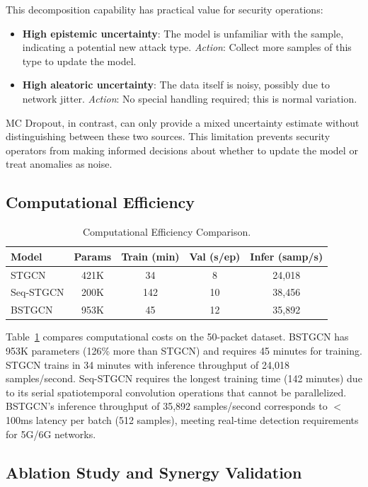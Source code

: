 \documentclass[lettersize,journal]{IEEEtran}
\begin{document}
This decomposition capability has practical value for security operations:
\begin{itemize}
\item \textbf{High epistemic uncertainty}: The model is unfamiliar with the sample, indicating a potential new attack type. \textit{Action}: Collect more samples of this type to update the model.
\item \textbf{High aleatoric uncertainty}: The data itself is noisy, possibly due to network jitter. \textit{Action}: No special handling required; this is normal variation.
\end{itemize}

MC Dropout, in contrast, can only provide a mixed uncertainty estimate without distinguishing between these two sources. This limitation prevents security operators from making informed decisions about whether to update the model or treat anomalies as noise.

\subsection{Computational Efficiency}

\begin{table}[!t]
\caption{Computational Efficiency Comparison.}
\label{tab:efficiency}
\centering
\begin{tabular}{lcccc}
\toprule
Model & Params & Train (min) & Val (s/ep) & Infer (samp/s) \\
\midrule
STGCN      & 421K & 34  & 8  & 24,018 \\
Seq-STGCN  & 200K & 142 & 10 & 38,456 \\
BSTGCN     & 953K & 45  & 12 & 35,892 \\
\bottomrule
\end{tabular}
\end{table}


Table~\ref{tab:efficiency} compares computational costs on the 50-packet dataset. BSTGCN has 953K parameters (126\% more than STGCN) and requires 45 minutes for training. STGCN trains in 34 minutes with inference throughput of 24,018 samples/second. Seq-STGCN requires the longest training time (142 minutes) due to its serial spatiotemporal convolution operations that cannot be parallelized. BSTGCN's inference throughput of 35,892 samples/second corresponds to $<$100ms latency per batch (512 samples), meeting real-time detection requirements for 5G/6G networks.

\subsection{Ablation Study and Synergy Validation}
\end{document}
